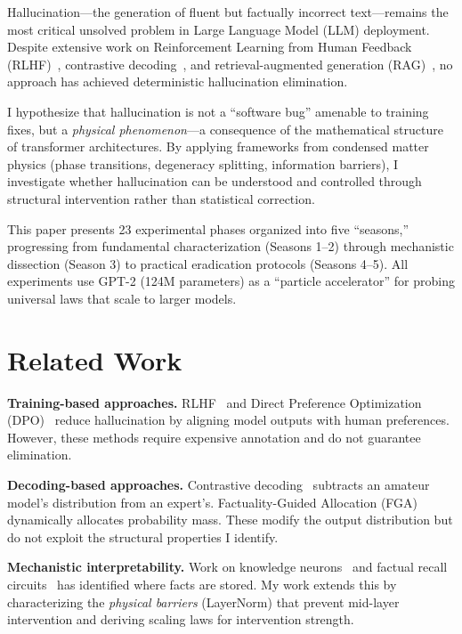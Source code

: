 \documentclass[11pt,a4paper]{article}
\begin{document}
Hallucination---the generation of fluent but factually incorrect text---remains the most critical unsolved problem in Large Language Model (LLM) deployment. Despite extensive work on Reinforcement Learning from Human Feedback (RLHF)~\cite{ouyang2022training}, contrastive decoding~\cite{li2023contrastive}, and retrieval-augmented generation (RAG)~\cite{lewis2020retrieval}, no approach has achieved deterministic hallucination elimination.

I hypothesize that hallucination is not a ``software bug'' amenable to training fixes, but a \emph{physical phenomenon}---a consequence of the mathematical structure of transformer architectures. By applying frameworks from condensed matter physics (phase transitions, degeneracy splitting, information barriers), I investigate whether hallucination can be understood and controlled through structural intervention rather than statistical correction.

This paper presents 23 experimental phases organized into five ``seasons,'' progressing from fundamental characterization (Seasons 1--2) through mechanistic dissection (Season 3) to practical eradication protocols (Seasons 4--5). All experiments use GPT-2 (124M parameters) as a ``particle accelerator'' for probing universal laws that scale to larger models.

\section{Related Work}

\textbf{Training-based approaches.} RLHF~\cite{ouyang2022training} and Direct Preference Optimization (DPO)~\cite{rafailov2023direct} reduce hallucination by aligning model outputs with human preferences. However, these methods require expensive annotation and do not guarantee elimination.

\textbf{Decoding-based approaches.} Contrastive decoding~\cite{li2023contrastive} subtracts an amateur model's distribution from an expert's. Factuality-Guided Allocation (FGA)~\cite{chen2024fga} dynamically allocates probability mass. These modify the output distribution but do not exploit the structural properties I identify.

\textbf{Mechanistic interpretability.} Work on knowledge neurons~\cite{dai2022knowledge} and factual recall circuits~\cite{meng2022locating} has identified where facts are stored. My work extends this by characterizing the \emph{physical barriers} (LayerNorm) that prevent mid-layer intervention and deriving scaling laws for intervention strength.
\end{document}
